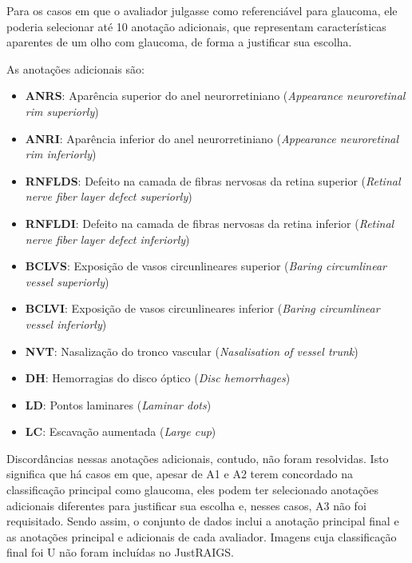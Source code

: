 \documentclass[12pt]{article}
\begin{document}
Para os casos em que o avaliador julgasse como referenciável para glaucoma, ele poderia selecionar até 10 anotação adicionais, que representam características aparentes de um olho com glaucoma, de forma a justificar sua escolha. \cite{justraigs_article}

As anotações adicionais são:
\begin{itemize}
    \setlength\itemsep{0em}
    \item \textbf{ANRS}: Aparência superior do anel neurorretiniano (\emph{Appearance neuroretinal rim superiorly})
    \item \textbf{ANRI}: Aparência inferior do anel neurorretiniano (\emph{Appearance neuroretinal rim inferiorly})
    \item \textbf{RNFLDS}: Defeito na camada de fibras nervosas da retina superior (\emph{Retinal nerve fiber layer defect superiorly})
    \item \textbf{RNFLDI}: Defeito na camada de fibras nervosas da retina inferior (\emph{Retinal nerve fiber layer defect inferiorly})
    \item \textbf{BCLVS}: Exposição de vasos circunlineares superior (\emph{Baring circumlinear vessel superiorly})
    \item \textbf{BCLVI}: Exposição de vasos circunlineares inferior (\emph{Baring circumlinear vessel inferiorly})
    \item \textbf{NVT}: Nasalização do tronco vascular (\emph{Nasalisation of vessel trunk})
    \item \textbf{DH}: Hemorragias do disco óptico (\emph{Disc hemorrhages})
    \item \textbf{LD}: Pontos laminares (\emph{Laminar dots})
    \item \textbf{LC}: Escavação aumentada (\emph{Large cup})
\end{itemize}

Discordâncias nessas anotações adicionais, contudo, não foram resolvidas. Isto significa que há casos em que, apesar de A1 e A2 terem concordado na classificação principal como glaucoma, eles podem ter selecionado anotações adicionais diferentes para justificar sua escolha e, nesses casos, A3 não foi requisitado. Sendo assim, o conjunto de dados inclui a anotação principal final e as anotações principal e adicionais de cada avaliador. Imagens cuja classificação final foi U não foram incluídas no JustRAIGS.

\end{document}
